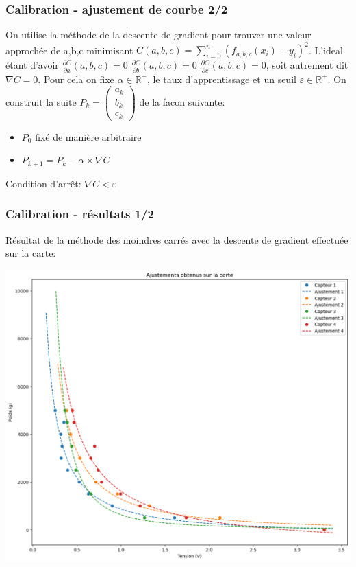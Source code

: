 \begin{frame}
    \frametitle{Calibration - ajustement de courbe 2/2}
    On utilise la méthode de la descente de gradient pour trouver une valeur approchée de a,b,c minimisant $C(a,b,c)=\sum_{i=0}^{n} (f_{a,b,c}(x_i)-y_i)^2$.
    L'ideal étant d'avoir $\frac{\partial C}{\partial a} (a,b,c) = 0$ $\frac{\partial C}{\partial b} (a,b,c) = 0$ $\frac{\partial C}{\partial c} (a,b,c) = 0$, soit autrement dit $\nabla C = 0$. Pour cela on fixe $\alpha \in \mathbb{R}^+$, le taux d'apprentissage et un seuil $\varepsilon \in \mathbb{R}^+$. On construit la suite $P_k=\begin{pmatrix} a_k \\ b_k \\ c_k \end{pmatrix}$ de la facon suivante:
    \begin{itemize}
        \item $P_0$ fixé de manière arbitraire
        \item $P_{k+1}= P_{k} - \alpha \times \nabla C$
    \end{itemize}
    Condition d'arrêt: $\nabla C < \varepsilon$
\end{frame}

\begin{frame}
    \frametitle{Calibration - résultats 1/2}
    Résultat de la méthode des moindres carrés avec la descente de gradient effectuée sur la carte:
    \begin{center}
        \includegraphics[scale=0.3]{./figures/cal_01.png}
    \end{center}
\end{frame}

